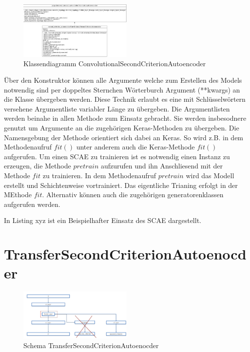 	\begin{figure}[h]
		\centering
		\includegraphics[width=0.5\textwidth, center]{bilder/Klassendiagramme/Klassendiagramm_CSCAE.png}
		\caption[Klassendiagramm ConvolutionalSecondCriterionAutoencoder]{Klassendiagramm ConvolutionalSecondCriterionAutoencoder}
	    \label{img:KlassendiagrammCSCAE}
	\end{figure}  
    Über den Konstruktor können alle Argumente welche zum Erstellen des Models notwendig sind per doppeltes Sternchen Wörterburch Argument (**kwargs) an die Klasse übergeben werden. Diese Technik erlaubt es eine mit Schlüsselwörtern versehene Argumentliste variabler Länge zu übergeben.  Die Argumentlisten  werden beinahe in allen Methode zum Einsatz gebracht. Sie werden insbesodnere genutzt um Argumente an die zugehörigen Keras-Methoden zu übergeben. Die Namensgebung der Methode orientiert sich dabei an Keras. So wird z.B. in dem Methodenaufruf $fit()$ unter anderem auch die Keras-Methode  $fit()$ aufgerufen. Um einen SCAE zu trainieren ist es notwendig einen Instanz zu erzeugen, die Methode $pretrain$ aufzurufen und ihn Anschliesend mit der Methode $fit$ zu trainieren.
    In dem Methodenaufruf $pretrain$ wird das Modell erstellt und Schichtenweise vortrainiert. Das eigentliche Trianing erfolgt in der MEthode $fit$. Alternativ können auch die zugehörigen generatorenklassen aufgerufen werden.
    
    
    In Listing xyz ist ein Beispielhafter Einsatz des SCAE dargestellt.


	\section{TransferSecondCriterionAutoenocder}
	\label{sec:TransferSecondCriterionAutoenocder}

	\begin{figure}[h]
		\centering
		\includegraphics[width=0.5\textwidth, center]{bilder/Schema_Autoencoders/Schema_TSCAE.png}
		\caption[Schema TransferSecondCriterionAutoenocder]{Schema TransferSecondCriterionAutoenocder}
		\label{img:SchemaTSCAE}
	\end{figure}  

